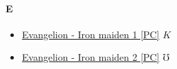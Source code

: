 		\paragraph{E} \hypertarget{GE}{}
			\begin{itemize}
				
				\item \href{https://mega.nz/#!NmIBALjb!gGZEGGGb9sffRxGasQUL-HvZsvZhjhcRewg57ICfBdI} {Evangelion - Iron maiden 1 [PC]} $K$ \\ 
				\item \href{https://mega.nz/#!Sv5VmDDT!ub2OqF28-5Jgpvog6Mao7oso15MECK9WTpcsDSQ7ywg} {Evangelion - Iron maiden 2 [PC]} $\mho$ \\ 
				
				
				
			\end{itemize}
		
